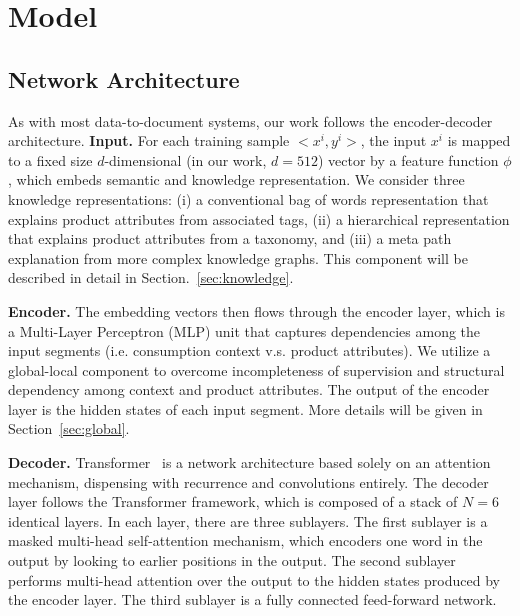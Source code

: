 \documentclass[sigconf]{acmart}
\begin{document}

\section{Model}\label{sec:model}

\subsection{Network Architecture}
As with most data-to-document systems, our work follows the encoder-decoder architecture. \textbf{Input.} For each training sample $<x^i,y^i>$, the input $x^i$ is mapped to a fixed size 
$d$-dimensional (in our work, $d=512$) vector  by a feature function $\phi$, which embeds semantic and knowledge representation. We consider three knowledge representations: (i)
a conventional bag of words representation that explains product attributes from associated tags, (ii) a
hierarchical representation that explains product attributes from a taxonomy, and (iii) a meta path explanation from more complex knowledge graphs. This component will be described in detail in Section.~\ref{sec:knowledge}.

\textbf{Encoder.}  The embedding vectors then flows through the encoder layer, which is a Multi-Layer Perceptron (MLP) unit that captures dependencies among the input segments (i.e. consumption context v.s. product attributes). We utilize a global-local component to overcome incompleteness of supervision and structural dependency among context and product attributes. The output of the encoder layer is the hidden states of each input segment. More details will be given in Section~\ref{sec:global}.  


\textbf{Decoder.} Transformer~\cite{vaswani2017attention} is a network architecture based solely on an attention mechanism, dispensing with recurrence and convolutions entirely. The decoder layer follows the Transformer framework, which is composed of a stack of $N = 6$ identical layers. In each layer, there are three sublayers.  The first sublayer is a masked multi-head self-attention mechanism, which encoders one word in the output by looking to earlier positions in the output. The second sublayer performs multi-head attention over the output to the hidden states produced by the encoder layer.  The third sublayer is a fully connected feed-forward network.
\end{document}

